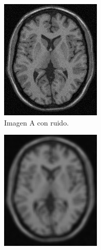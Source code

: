 \documentclass[letterpaper,12pt]{article}
\theoremstyle{plain}
\begin{document}
\begin{figure}[H]
\begin{subfigure}[h]{0.2\textwidth}
           \includegraphics[width=\textwidth]{Figuras/ImagenA_noise=5.png}
           \caption{Imagen A con ruido.} 
        \end{subfigure}
        \begin{subfigure}[h]{0.2\textwidth}
           \centering
           \includegraphics[width=\textwidth]{Figuras/ImagenA_noise=5_filter_7x7.png}

\end{subfigure}
\end{figure}
\end{document}
